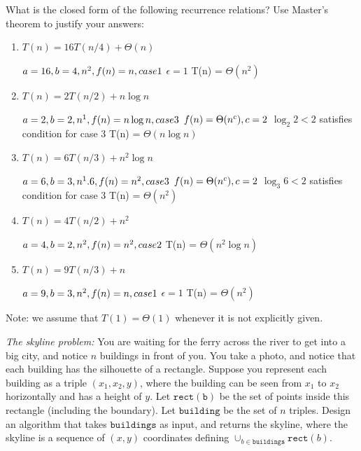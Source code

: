 \documentclass{article}
\begin{document}
\nextprob
What is the closed form of the following recurrence relations?  Use Master's
theorem to justify your answers:
\begin{enumerate}
    \item $T(n) = 16 T(n/4) + \Theta(n)$
    
    $a = 16, b = 4, n^2, f(n) = n, case  1\newline$
    $\epsilon = 1$
    T(n) =  $\Theta(n^2)$
    
    \item $T(n) = 2 T(n/2) + n \log{n}$
    
    $a = 2, b = 2, n^1, f(n) = n\log{n}, case 3\newline$
    $f(n) = \Theta(n^c), c = 2\newline$
    $\log_{2}2 < 2$ satisfies condition for case 3 \newline
    T(n) = $\Theta(n\log{n})$
    
    \item $T(n) = 6 T(n/3) + n^2 \log{n}$
    
   $a = 6, b = 3, n^1.6, f(n) = n^2, case 3\newline$
   $f(n) = \Theta(n^c), c = 2\newline$
    $\log_{3}6 < 2$ satisfies condition for case 3 \newline
    T(n) = $\Theta(n^2)$
    
    \item $T(n) = 4 T(n/2) + n^2$
    
    $a = 4, b = 2, n^2, f(n) = n^2, case 2 \newline$
    T(n) = $\Theta(n^2\log{n})$
    
    \item $T(n) = 9 T(n/3) + n$
    
    $a = 9, b = 3, n^2, f(n) = n, case 1\newline$
    $\epsilon = 1$
    T(n) = $\Theta(n^2)$
    
    
\end{enumerate}
Note: we assume that $T(1)=\Theta(1)$ whenever it is not explicitly given.

\nextprob
\emph{The skyline problem:} You are waiting for the ferry across the river to
get into a big city, and notice
$n$ buildings in front of you.  You take a photo, and notice that each building
has the silhouette of a rectangle.  Suppose you  represent each building as a
triple $(x_1,x_2,y)$, where the building can be seen from $x_1$ to $x_2$
horizontally and has a height of $y$.  Let $\mathtt{rect(b)}$ be the set of
points inside this rectangle (including the boundary).  Let $\mathtt{building}$ be the set of $n$
triples. Design an algorithm that takes $\mathtt{buildings}$ as input, and
returns the skyline, where the skyline is a sequence of $(x,y)$ coordinates
defining $\cup_{b \in \mathtt{buildings}} \mathtt{rect}(b)$.
\end{document}
